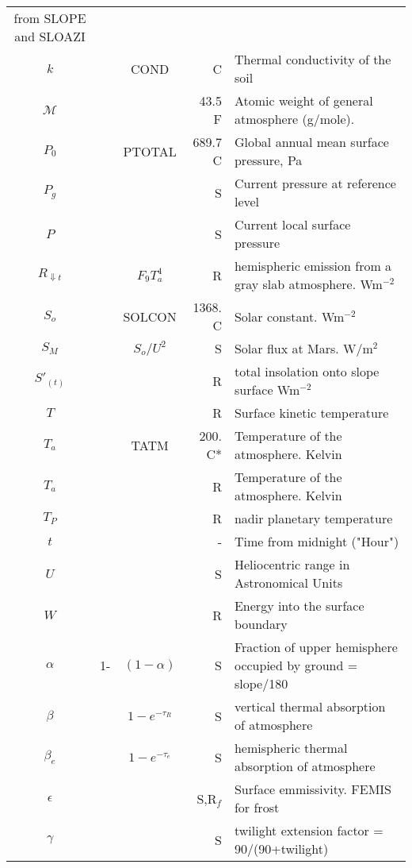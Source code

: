 \begin{table}[ht]
\begin{center}
\begin{tabular}{ c c c r  l }
                          from SLOPE and SLOAZI \\
$k$  & \ct{COND} &  COND   &  C & Thermal conductivity of the soil \\
$\mathcal{M}$ & \ct{AMW} &   & 43.5 F & Atomic weight of general atmosphere
                        (g/mole). \\ 
$P_0$    & \ct{PTOTAL}    &  PTOTAL  & 689.7 C & Global annual mean surface
pressure, Pa \\
$P_g$   & \ct{PZREF} &  & S  & Current pressure at reference level\\
$P$  & \ct{PRES} &   & S & Current local surface pressure \\
$R_{\Downarrow t} $   & \ct{ATMRAD} &  $ F_9 T_a^4 $   & R &  hemispheric 
        emission from a gray slab atmosphere.  Wm$^{-2}$\\
$S_o$   & \ct{SOLCON} & SOLCON & 1368. C  & Solar constant. Wm$^{-2}$ \\
$S_M$   & \ct{SOL} & $S_o/U^2$   &  S & Solar flux at Mars. W/m$^2$ \\
$S'_{(t)}$   & \ct{ASOL} &   & R & total insolation onto slope surface  Wm$^{-2}$\\
$T$   & \ct{TSUR} &   & R & Surface kinetic temperature\\
$T_a$   & \ct{TATM} & TATM   & 200. C* & Temperature of the atmosphere. Kelvin \\ 
$T_a$   & \ct{TATMJ} &    & R & Temperature of the atmosphere. Kelvin \\
$T_P$   & \ct{TPFH} &   & R & nadir planetary temperature \\
$t$   & \ct{} &   & - & Time from midnight ("Hour") \\
$U$   & \ct{DAU} &   & S & Heliocentric range in Astronomical Units\\
$W$   & \ct{POWER} &   & R  & Energy into the surface boundary\\
$\alpha$  & 1-\ct{SKYFAC} & $(1-\alpha) $  & S & Fraction of upper hemisphere occupied by ground = slope/180  \\
$\beta$   & \ct{BETA} & $ 1-e^{-\tau_R}$   & S & vertical thermal absorption of atmosphere \\
$\beta_e$   & \ct{BETH} & $ 1-e^{-\tau_e}$  &  S & hemispheric thermal absorption of atmosphere \\
$\epsilon$   & \ct{EMIS} &   & S,R$_f$ & Surface emmissivity.  FEMIS for frost \\
$\gamma$   & \ct{TWILFAC} &   & S & twilight extension factor = 90/(90+twilight)\\

\end{tabular}
\end{center}
\end{table}
